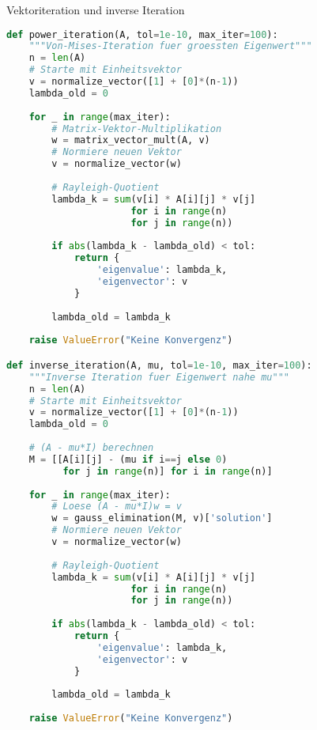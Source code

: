 \begin{examplecode}{Vektoriteration und inverse Iteration}
\begin{lstlisting}[language=Python, style=basesmol]
def power_iteration(A, tol=1e-10, max_iter=100):
    """Von-Mises-Iteration fuer groessten Eigenwert"""
    n = len(A)
    # Starte mit Einheitsvektor
    v = normalize_vector([1] + [0]*(n-1))
    lambda_old = 0
    
    for _ in range(max_iter):
        # Matrix-Vektor-Multiplikation
        w = matrix_vector_mult(A, v)
        # Normiere neuen Vektor
        v = normalize_vector(w)
        
        # Rayleigh-Quotient
        lambda_k = sum(v[i] * A[i][j] * v[j] 
                      for i in range(n) 
                      for j in range(n))
        
        if abs(lambda_k - lambda_old) < tol:
            return {
                'eigenvalue': lambda_k,
                'eigenvector': v
            }
            
        lambda_old = lambda_k
        
    raise ValueError("Keine Konvergenz")

def inverse_iteration(A, mu, tol=1e-10, max_iter=100):
    """Inverse Iteration fuer Eigenwert nahe mu"""
    n = len(A)
    # Starte mit Einheitsvektor
    v = normalize_vector([1] + [0]*(n-1))
    lambda_old = 0
    
    # (A - mu*I) berechnen
    M = [[A[i][j] - (mu if i==j else 0) 
          for j in range(n)] for i in range(n)]
    
    for _ in range(max_iter):
        # Loese (A - mu*I)w = v
        w = gauss_elimination(M, v)['solution']
        # Normiere neuen Vektor
        v = normalize_vector(w)
        
        # Rayleigh-Quotient
        lambda_k = sum(v[i] * A[i][j] * v[j] 
                      for i in range(n) 
                      for j in range(n))
        
        if abs(lambda_k - lambda_old) < tol:
            return {
                'eigenvalue': lambda_k,
                'eigenvector': v
            }
            
        lambda_old = lambda_k
        
    raise ValueError("Keine Konvergenz")
\end{lstlisting}
\end{examplecode}

